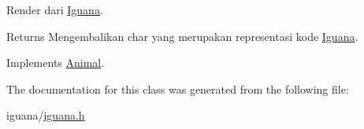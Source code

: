 Render dari \hyperlink{classIguana}{Iguana}. 

\begin{DoxyReturn}{Returns}
Mengembalikan char yang merupakan representasi kode \hyperlink{classIguana}{Iguana}. 
\end{DoxyReturn}


Implements \hyperlink{classAnimal_a43a47c0f41d211128e04abc6add53def}{Animal}.



The documentation for this class was generated from the following file\+:\begin{DoxyCompactItemize}
\item 
iguana/\hyperlink{iguana_8h}{iguana.\+h}\end{DoxyCompactItemize}
